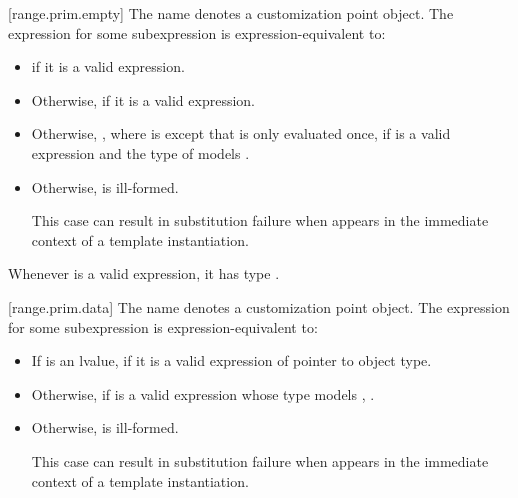 [range.prim.empty]{}
\pnum
The name  denotes a customization point
object. The expression
 for some subexpression  is
expression-equivalent to:
\begin{itemize}
\item
   if it is a valid expression.

\item
  Otherwise,  if it is a valid expression.

\item
  Otherwise, , where  is
  except that  is only evaluated once,
  if  is a valid expression and
  the type of  models .

\item
  Otherwise,  is ill-formed.
  \begin{note}
  This case can result in substitution failure when 
  appears in the immediate context of a template instantiation.
  \end{note}
\end{itemize}

\pnum
\begin{note}
Whenever  is a valid expression,
it has type .
\end{note}

[range.prim.data]{}
\pnum
The name  denotes a customization point
object. The expression
 for some subexpression  is
expression-equivalent to:
\begin{itemize}
\item
  If  is an lvalue, 
  if it is a valid expression of pointer to object type.

\item
  Otherwise, if  is a valid expression whose type models
  ,
  .

\item
  Otherwise,  is ill-formed.
  \begin{note}
  This case can result in substitution failure when 
  appears in the immediate context of a template instantiation.
  \end{note}
\end{itemize}

